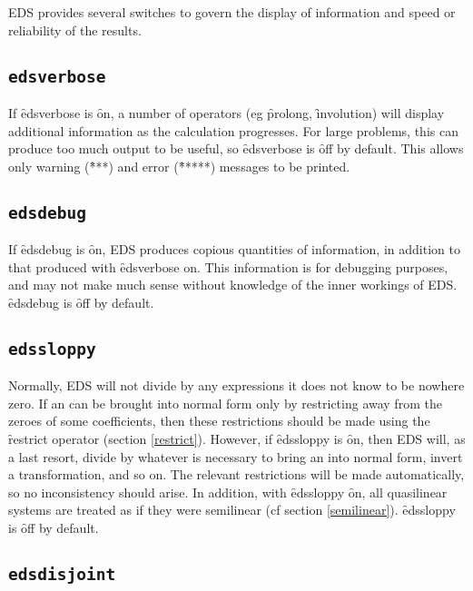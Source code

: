 EDS provides several switches to govern the display of information and 
speed or reliability of the results.

\subsection{\tt edsverbose}
\label{edsverbose}

If \f{edsverbose} is \f{on}, a number of operators (eg \f{prolong},
\f{involution}) will display additional information as the calculation
progresses. For large problems, this can produce too much output to be
useful, so \f{edsverbose} is \f{off} by default. This allows only warning
(\f{***}) and error (\f{*****}) messages to be printed.

\subsection{\tt edsdebug}
\label{edsdebug}

If \f{edsdebug} is \f{on}, EDS produces copious quantities of information,
in addition to that produced with \f{edsverbose} on. This information is
for debugging purposes, and may not make much sense without knowledge of
the inner workings of EDS. \f{edsdebug} is \f{off} by default.

\subsection{\tt edssloppy}
\label{edssloppy}

Normally, EDS will not divide by any expressions it does not know to be
nowhere zero. If an  can be brought into normal form only by
restricting away from the zeroes of some coefficients, then these
restrictions should be made using the \f{restrict} operator (section
\ref{restrict}). However, if \f{edssloppy} is \f{on}, then EDS will, as a
last resort, divide by whatever is necessary to bring an  into
normal form, invert a transformation, and so on. The relevant restrictions
will be made automatically, so no inconsistency should arise. In addition,
with \f{edssloppy} \f{on}, all quasilinear systems are treated as if they
were semilinear (cf section \ref{semilinear}). \f{edssloppy} is \f{off} by
default.


\subsection{\tt edsdisjoint}
\label{edsdisjoint}


